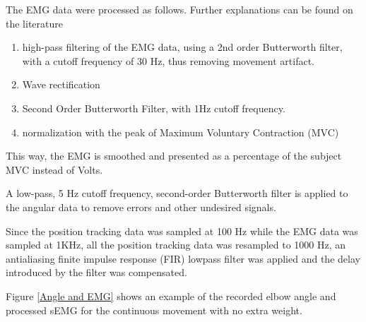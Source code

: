 The EMG data were processed as follows. Further explanations can be found on the literature \cite{Rose20161112}\cite{hayashibe:lirmm-00429594}
\begin{enumerate}
\item high-pass filtering of the EMG data, using a 2nd order Butterworth filter, with a cutoff frequency of 30 Hz, thus removing movement artifact.
\item Wave rectification
\item Second Order Butterworth Filter, with 1Hz cutoff frequency.
\item normalization with the peak of Maximum Voluntary Contraction (MVC)
\end{enumerate}

This way, the EMG is smoothed and presented as a percentage of the subject MVC instead of Volts.

A low-pass, 5 Hz cutoff frequency, second-order Butterworth filter is applied to the angular data to remove errors and other undesired signals.

Since the position tracking data was sampled at 100 Hz while the EMG data was sampled at 1KHz, all the position tracking data was resampled to 1000 Hz, an antialiasing finite impulse response (FIR) lowpass filter was applied and the delay introduced by the filter was compensated.

Figure \ref{Angle and EMG} shows an example of the recorded elbow angle and processed sEMG for the continuous movement with no extra weight.



